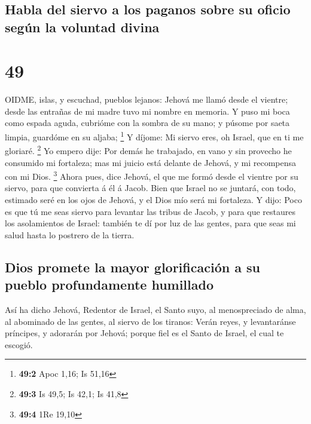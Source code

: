 \hypertarget{habla-del-siervo-a-los-paganos-sobre-su-oficio-seguxfan-la-voluntad-divina}{%
\subsection{Habla del siervo a los paganos sobre su oficio según la
voluntad
divina}\label{habla-del-siervo-a-los-paganos-sobre-su-oficio-seguxfan-la-voluntad-divina}}

\hypertarget{section-48}{%
\section{49}\label{section-48}}

 OIDME, islas, y escuchad, pueblos lejanos: Jehová me llamó
desde el vientre; desde las entrañas de mi madre tuvo mi nombre en
memoria.  Y puso mi boca como espada aguda, cubrióme con la
sombra de su mano; y púsome por saeta limpia, guardóme en su aljaba;
\footnote{\textbf{49:2} Apoc 1,16; Is 51,16}  Y díjome: Mi
siervo eres, oh Israel, que en ti me gloriaré. \footnote{\textbf{49:3}
  Is 49,5; Is 42,1; Is 41,8}  Yo empero dije: Por demás he
trabajado, en vano y sin provecho he consumido mi fortaleza; mas mi
juicio está delante de Jehová, y mi recompensa con mi Dios. \footnote{\textbf{49:4}
  1Re 19,10}  Ahora pues, dice Jehová, el que me formó desde
el vientre por su siervo, para que convierta á él á Jacob. Bien que
Israel no se juntará, con todo, estimado seré en los ojos de Jehová, y
el Dios mío será mi fortaleza.  Y dijo: Poco es que tú me
seas siervo para levantar las tribus de Jacob, y para que restaures los
asolamientos de Israel: también te dí por luz de las gentes, para que
seas mi salud hasta lo postrero de la tierra.

\hypertarget{dios-promete-la-mayor-glorificaciuxf3n-a-su-pueblo-profundamente-humillado}{%
\subsection{Dios promete la mayor glorificación a su pueblo
profundamente
humillado}\label{dios-promete-la-mayor-glorificaciuxf3n-a-su-pueblo-profundamente-humillado}}

 Así ha dicho Jehová, Redentor de Israel, el Santo suyo, al
menospreciado de alma, al abominado de las gentes, al siervo de los
tiranos: Verán reyes, y levantaránse príncipes, y adorarán por Jehová;
porque fiel es el Santo de Israel, el cual te escogió.

